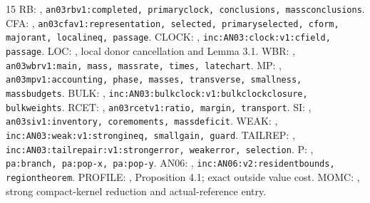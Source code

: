 \documentclass[11pt]{article}
\numberwithin{equation}{section}
\theoremstyle{remark}\newtheorem{remark}[theorem]{Remark}
\begin{document}
\begin{thebibliography}{15}\small
{} RB: ,
\texttt{an03rbv1:completed, primaryclock, conclusions, massconclusions}.
 CFA: ,
\texttt{an03cfav1:representation, selected, primaryselected, cform,
majorant, localineq, passage}.
 CLOCK: ,
\texttt{inc:AN03:clock:v1:cfield, passage}.
 LOC: ,
local donor cancellation and Lemma 3.1.
 WBR: ,
\texttt{an03wbrv1:main, mass, massrate, times, latechart}.
 MP: ,
\texttt{an03mpv1:accounting, phase, masses, transverse, smallness,
massbudgets}.
 BULK: ,
\texttt{inc:AN03:bulkclock:v1:bulkclockclosure, bulkweights}.
 RCET: ,
\texttt{an03rcetv1:ratio, margin, transport}.
 SI: ,
\texttt{an03siv1:inventory, coremoments, massdeficit}.
 WEAK: ,
\texttt{inc:AN03:weak:v1:strongineq, smallgain, guard}.
 TAILREP: ,
\texttt{inc:AN03:tailrepair:v1:strongerror, weakerror, selection}.
 P: ,
\texttt{pa:branch, pa:pop-x, pa:pop-y}.
 AN06: ,
\texttt{inc:AN06:v2:residentbounds, regiontheorem}.
 PROFILE: ,
Proposition 4.1; exact outside value cost.
 MOMC: ,
strong compact-kernel reduction and actual-reference entry.
\end{thebibliography}
\end{document}
